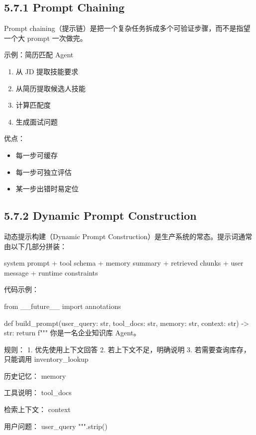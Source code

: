 \subsection{5.7.1 Prompt Chaining}

Prompt chaining（提示链）是把一个复杂任务拆成多个可验证步骤，而不是指望一个大 prompt 一次做完。


示例：简历匹配 Agent


\begin{enumerate}[leftmargin=2em]
\item 从 JD 提取技能要求
\item 从简历提取候选人技能
\item 计算匹配度
\item 生成面试问题
\end{enumerate}

优点：


\begin{itemize}[leftmargin=2em]
\item 每一步可缓存
\item 每一步可独立评估
\item 某一步出错时易定位
\end{itemize}

\subsection{5.7.2 Dynamic Prompt Construction}

动态提示构建（Dynamic Prompt Construction）是生产系统的常态。提示词通常由以下几部分拼装：


\begin{codeblock}
system prompt
+ tool schema
+ memory summary
+ retrieved chunks
+ user message
+ runtime constraints
\end{codeblock}

代码示例：


\begin{codeblock}
from __future__ import annotations

def build_prompt(user_query: str, tool_docs: str, memory: str, context: str) -> str:
    return f"""
你是一名企业知识库 Agent。

规则：
1. 优先使用上下文回答
2. 若上下文不足，明确说明
3. 若需要查询库存，只能调用 inventory_lookup

历史记忆：
{memory}

工具说明：
{tool_docs}

检索上下文：
{context}

用户问题：
{user_query}
""".strip()
\end{codeblock}

